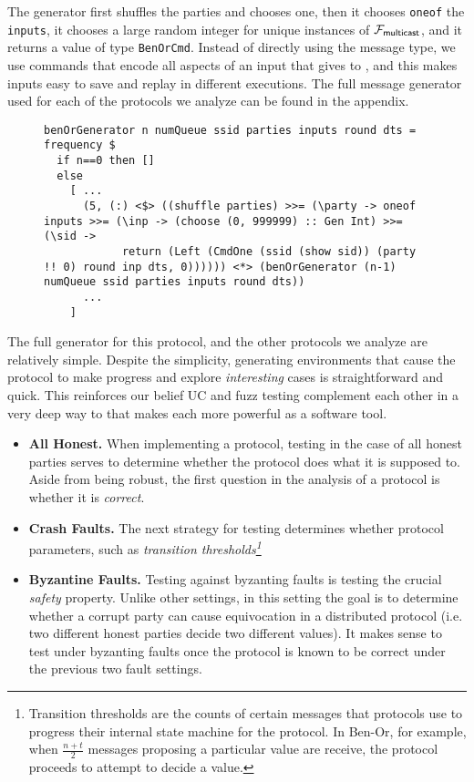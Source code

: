 The generator first shuffles the parties and chooses one, then it chooses \texttt{oneof} the \texttt{inputs}, it chooses a large random integer for unique instances of $\mathcal{F}_{{\mathsf {multicast}}}$, and it returns a value of type \texttt{BenOrCmd}.
Instead of directly using the message type, we use commands that encode all aspects of an input that \Z gives to \A, and this makes inputs easy to save and replay in different executions.
The full message generator used for each of the protocols we analyze can be found in the appendix.
\begin{figure*}
\begin{lstlisting}
benOrGenerator n numQueue ssid parties inputs round dts = frequency $
  if n==0 then []
  else  
    [ ...
      (5, (:) <$> ((shuffle parties) >>= (\party -> oneof inputs >>= (\inp -> (choose (0, 999999) :: Gen Int) >>= (\sid -> 
            return (Left (CmdOne (ssid (show sid)) (party !! 0) round inp dts, 0)))))) <*> (benOrGenerator (n-1) numQueue ssid parties inputs round dts))
      ...
    ]
\end{lstlisting}
\end{figure*}
The full generator for this protocol, and the other protocols we analyze are relatively simple. 
Despite the simplicity, generating environments that cause the protocol to make progress and explore \emph{interesting} cases is straightforward and quick.
This reinforces our belief UC and fuzz testing complement each other in a very deep way to that makes each more powerful as a software tool. 

\begin{itemize}
  \item \textbf{All Honest.} When implementing a protocol, testing in the case of all honest parties serves to determine whether the protocol does what it is supposed to. Aside from being robust, the first question in the analysis of a protocol is whether it is \emph{correct}.
  \item \textbf{Crash Faults.} The next strategy for testing determines whether protocol parameters, such as \emph{transition thresholds\footnote{Transition thresholds are the counts of certain messages that protocols use to progress their internal state machine for the protocol. In Ben-Or, for example, when $\frac{n+t}{2}$ messages proposing a particular value are receive, the protocol proceeds to attempt to decide a value.}}
  \item \textbf{Byzantine Faults.} Testing against byzanting faults is testing the crucial \emph{safety} property. Unlike other settings, in this setting the goal is to determine whether a corrupt party can cause equivocation in a distributed protocol (i.e. two different honest parties decide two different values). It makes sense to test under byzanting faults once the protocol is known to be correct under the previous two fault settings. 
\end{itemize}

